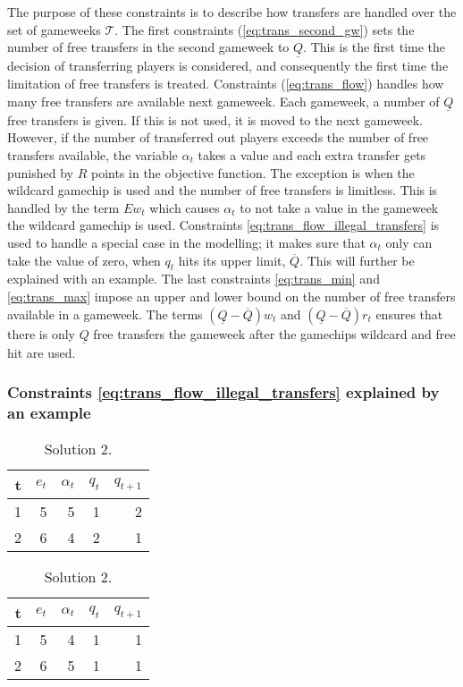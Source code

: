 The purpose of these constraints is to describe how transfers are handled over the set of gameweeks $\mathcal{T}$. The first constraints (\ref{eq:trans_second_gw}) sets the number of free transfers in the second gameweek to $\underline{Q}$. This is the first time the decision of transferring players is considered, and consequently the first time the limitation of free transfers is treated. Constraints (\ref{eq:trans_flow}) handles how many free transfers are available next gameweek. Each gameweek, a number of $\underline{Q}$ free transfers is given. If this is not used, it is moved to the next gameweek. However, if the number of transferred out players exceeds the number of free transfers available, the variable $\alpha_{t}$ takes a value and each extra transfer gets punished by $R$ points in the objective function. The exception is when the wildcard gamechip is used and the number of free transfers is limitless. This is handled by the term $E w_{t}$ which causes $\alpha_{t}$ to not take a value in the gameweek the wildcard gamechip is used. Constraints \eqref{eq:trans_flow_illegal_transfers} is used to handle a special case in the modelling; it makes sure that $\alpha_{t}$ only can take the value of zero, when $q_{t}$ hits its upper limit, $\overline{Q}$. This will further be explained with an example. The last constraints \eqref{eq:trans_min} and \eqref{eq:trans_max} impose an upper and lower bound on the number of free transfers available in a gameweek. The terms $(\underline{Q}-\overline{Q})w_{t}$ and $(\underline{Q}-\overline{Q})r_{t}$ ensures that there is only $\underline{Q}$ free transfers the gameweek after the gamechips wildcard and free hit are used. 

\subsubsection{Constraints \eqref{eq:trans_flow_illegal_transfers} explained by an example}

\begin{table}[H]
\parbox{.45\linewidth}{
\centering
\begin{tabular}{@{}|r|r|r|r|r|@{}}
\hline
t   & $e_{t}$  & $\alpha_{t}$  & $q_{t}$  & $q_{t+1}$   \\
\hline
1  & 5  & 5  & 1  & 2   \\
\hline
2  & 6  & 4  & 2  & 1   \\
\hline
\end{tabular}
\caption*{Solution 1.}
}
\hfill
\parbox{.45\linewidth}{
\centering
\begin{tabular}{@{}|r|r|r|r|r|@{}}
\hline
t   & $e_{t}$  & $\alpha_{t}$  & $q_{t}$  & $q_{t+1}$   \\
\hline
1  & 5  & 4  & 1  & 1   \\
\hline
2  & 6  & 5  & 1  & 1   \\
\hline
\end{tabular}
\caption*{Solution 2.}
}
\end{table}

